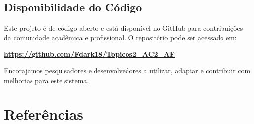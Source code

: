 \documentclass[12pt,a4paper]{article}
\begin{document}
\subsection{Disponibilidade do Código}

Este projeto é de código aberto e está disponível no GitHub para contribuições da comunidade acadêmica e profissional. O repositório pode ser acessado em:

\begin{center}
\textbf{\url{https://github.com/Fdark18/Topicos2_AC2_AF}}
\end{center}

Encorajamos pesquisadores e desenvolvedores a utilizar, adaptar e contribuir com melhorias para este sistema.

\section{Referências}
\end{document}
